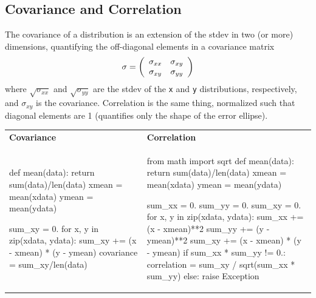 \documentclass[12pt]{article}
\begin{document}
\subsection{Covariance and Correlation}

The covariance of a distribution is an extension of the stdev in two
(or more) dimensions, quantifying the off-diagonal elements in a
covariance matrix
\begin{equation}
\sigma = \left(\begin{array}{c c}
\sigma_{xx} & \sigma_{xy} \\
\sigma_{xy} & \sigma_{yy}
\end{array}\right)
\end{equation}
where $\sqrt{\sigma_{xx}}$ and $\sqrt{\sigma_{yy}}$ are the stdev of the
{\tt x} and {\tt y} distributions, respectively, and $\sigma_{xy}$
is the covariance.  Correlation is the same thing, normalized such
that diagonal elements are 1 (quantifies only the shape of the error
ellipse).

\vspace{0.6 cm}
\begin{tabular}{p{0.45\linewidth} p{0.55\linewidth}}
{\bf Covariance} & {\bf Correlation} \\
\begin{python}
def mean(data):
    return sum(data)/len(data)
xmean = mean(xdata)
ymean = mean(ydata)

sum_xy = 0.
for x, y in zip(xdata, ydata):
    sum_xy += (x - xmean) *
              (y - ymean)
covariance = sum_xy/len(data)
\end{python} &
\begin{python}
from math import sqrt
def mean(data):
    return sum(data)/len(data)
xmean = mean(xdata)
ymean = mean(ydata)

sum_xx = 0.
sum_yy = 0.
sum_xy = 0.
for x, y in zip(xdata, ydata):
    sum_xx += (x - xmean)**2
    sum_yy += (y - ymean)**2
    sum_xy += (x - xmean) *
              (y - ymean)
if sum_xx * sum_yy != 0.:
    correlation = sum_xy /
            sqrt(sum_xx * sum_yy)
else: raise Exception
\end{python}
\end{tabular}
\end{document}
